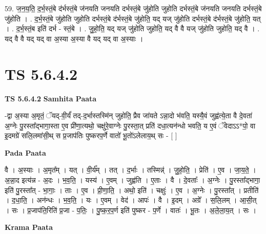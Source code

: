 \documentclass[17pt]{extarticle}
\begin{document}
59. ज॒न॒य॒ति॒ द॒र्भ॒स्तं॒बे द॑र्भस्तं॒बे ज॑नयति जनयति दर्भस्तं॒बे जु॑होति जुहोति दर्भस्तं॒बे ज॑नयति जनयति दर्भस्तं॒बे जु॑होति । . द॒र्भ॒स्तं॒बे जु॑होति जुहोति दर्भस्तं॒बे द॑र्भस्तं॒बे जु॑होति॒ यद् यज् जु॑होति दर्भस्तं॒बे द॑र्भस्तं॒बे जु॑होति॒ यत् । . द॒र्भ॒स्तं॒ब इति॑ दर्भ - स्तं॒बे । . जु॒हो॒ति॒ यद् यज् जु॑होति जुहोति॒ यद् वै वै यज् जु॑होति जुहोति॒ यद् वै । . यद् वै वै यद् यद् वा अ॒स्या अ॒स्या वै यद् यद् वा अ॒स्याः । \newline
\pagebreak
{}

\section{ TS 5.6.4.2 }

\textbf{TS 5.6.4.2 } \newline
\textbf{Samhita Paata} \newline

-द्वा अ॒स्या अ॒मृतं॒ ॅयद्-वी॒र्यं॑ तद्-द॒र्भास्तस्मि॑न् जुहोति॒ प्रैव जा॑यते ऽन्ना॒दो भ॑वति॒ यस्यै॒वं जुह्व॑त्ये॒ता वै दे॒वता॑ अ॒ग्नेः पु॒रस्ता᳚द्भागा॒स्ता ए॒व प्री॑णा॒त्यथो॒ चक्षु॑रे॒वाग्नेः पु॒रस्ता॒त् प्रति॑ दधा॒त्यन॑न्धो भवति॒ य ए॒वं ॅवेदाऽऽ*पो॒ वा इ॒दमग्रे॑ सलि॒लमा॑सी॒थ् स प्र॒जाप॑तिः पुष्करप॒र्णे वातो॑ भू॒तो॑ऽलेलाय॒थ् सः - [  ] \newline

\textbf{Pada Paata} \newline

वै । अ॒स्याः । अ॒मृत᳚म् । यत् । वी॒र्य᳚म् । तत् । द॒र्भाः । तस्मिन्न्॑ । जु॒हो॒ति॒ । प्रेति॑ । ए॒व । जा॒य॒ते॒ । अ॒न्ना॒द इत्य॑न्न - अ॒दः । भ॒व॒ति॒ । यस्य॑ । ए॒वम् । जुह्व॑ति । ए॒ताः । वै । दे॒वताः᳚ । अ॒ग्नेः । पु॒रस्ता᳚द्भागा॒ इति॑ पु॒रस्ता᳚त् - भा॒गाः॒ । ताः । ए॒व । प्री॒णा॒ति॒ । अथो॒ इति॑ । चक्षुः॑ । ए॒व । अ॒ग्नेः । पु॒रस्ता᳚त् । प्रतीति॑ । द॒धा॒ति॒ । अन॑न्धः । भ॒व॒ति॒ । यः । ए॒वम् । वेद॑ । आपः॑ । वै । इ॒दम् । अग्रे᳚ । स॒लि॒लम् । आ॒सी॒त् । सः । प्र॒जाप॑ति॒रिति॑ प्र॒जा - प॒तिः॒ । पु॒ष्क॒र॒प॒र्ण इति॑ पुष्कर - प॒र्णे । वातः॑ । भू॒तः । अ॒ले॒ला॒य॒त् । सः ।  \newline


\textbf{Krama Paata} \newline
\end{document}

